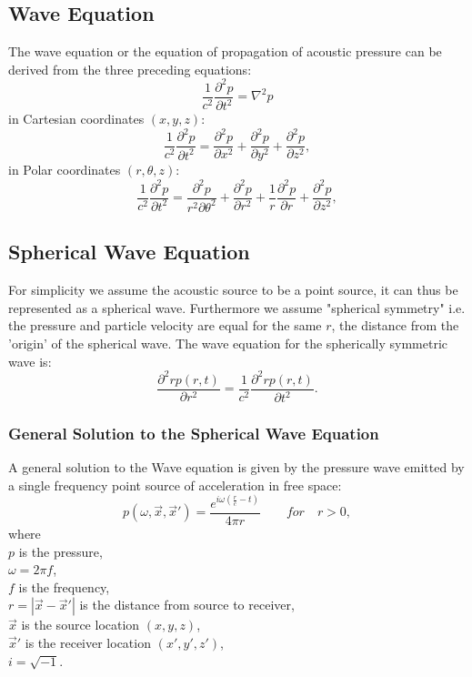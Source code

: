 \subsection{Wave Equation}
The wave equation or the equation of propagation of acoustic pressure can be derived from the three preceding equations:
\begin{equation}
    \frac{1}{c^2}\frac{\partial^2p}{\partial t^2} = \nabla^2p
\end{equation}
in Cartesian coordinates $(x,y,z)$:
\begin{equation}
    \frac{1}{c^2}\frac{\partial^2p}{\partial t^2} = \frac{\partial^2p}{\partial x^2} + \frac{\partial^2p}{\partial y^2} + \frac{\partial^2p}{\partial z^2},
\end{equation}
in Polar coordinates $(r,\theta, z)$:
\begin{equation}
    \frac{1}{c^2}\frac{\partial^2p}{\partial t^2} = \frac{\partial^2p}{r^2\partial \theta^2} + \frac{\partial^2p}{\partial r^2} + \frac{1}{r}\frac{\partial^2p}{\partial r} + \frac{\partial^2p}{\partial z^2},
\end{equation}

\subsection{Spherical Wave Equation}

For simplicity we assume the acoustic source to be a point source, it can thus be represented as a spherical wave. Furthermore we assume "spherical symmetry" i.e. the pressure and particle velocity are equal for the same $r$, the distance from the 'origin' of the spherical wave. The wave equation for the spherically symmetric wave is\cite{Waves2004}:
\begin{equation}
    \frac{\partial^2rp(r,t)}{\partial r^2} = \frac{1}{c^2}\frac{\partial^2rp(r,t)}{\partial t^2}.
\end{equation}
\subsubsection{General Solution to the Spherical Wave Equation}
A general solution to the Wave equation is given by the pressure wave emitted by a single frequency point source of acceleration in free space\cite{Allen1979}:
\begin{equation}
    p(\omega,\Vec{x},\Vec{x}') = \frac{e^{i\omega(\frac{r}{c}-t)}}{4\pi r}\quad\quad for\quad r > 0,
\end{equation}
where\\
$p$ is the pressure,\\
$\omega=2\pi f$,\\
$f$ is the frequency,\\
$r=|\Vec{x}-\Vec{x}'|$ is the distance from source to receiver,\\
$\Vec{x}$ is the source location $(x,y,z)$,\\
$\Vec{x}'$ is the receiver location $(x',y',z')$,\\
$i=\sqrt{-1}$.\\



